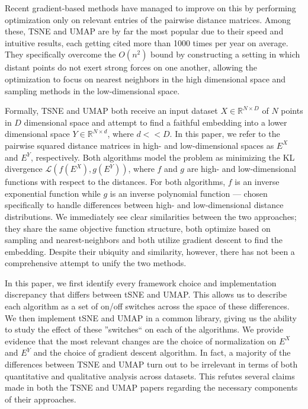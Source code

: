 \documentclass[sigconf, nonacm]{acmart}
\begin{document}
Recent gradient-based methods have managed to improve on this by performing optimization only on relevant entries of the pairwise distance matrices.
Among these, TSNE and UMAP are by far the most popular due to their speed and intuitive results, each getting cited more than 1000 times per year on average.
They specifically overcome the $O(n^2)$ bound by constructing a setting in which distant points do not exert strong forces on one another, allowing the optimization to focus on nearest neighbors in the high dimensional space and sampling methods in the low-dimensional space.

Formally, TSNE \cite{van2008visualizing} and UMAP \cite{mcinnes2018umap} both receive an input dataset $X \in \mathbb{R}^{N \times D}$ of
$N$ points in $D$ dimensional space and
attempt to find a faithful embedding into a lower dimensional space $Y \in \mathbb{R}^{N \times d}$, where $d << D$. 
 In this paper, we refer to the pairwise squared distance matrices in high- and low-dimensional spaces as $E^X$ and $E^Y$, respectively.
Both algorithms model the problem as minimizing the KL divergence $\mathcal{L}(f(E^X), g(E^Y))$, where $f$ and $g$ are high- and
low-dimensional functions with respect to the distances. For both algorithms, $f$ is an inverse exponential function while $g$ is an inverse polynomial function --- chosen specifically to handle differences between high- and low-dimensional distance distributions.
We immediately see clear similarities between the two approaches; they share the same objective function structure, both optimize based
on sampling and nearest-neighbors and both utilize gradient descent to find the embedding. Despite their ubiquity and similarity, however, there has not been
a comprehensive attempt to unify the two methods.

In this paper, we first identify every framework choice and implementation discrepancy that differs between tSNE and UMAP. This allows us to describe each algorithm as a set of on/off
switches across the space of these differences. We then implement tSNE and UMAP in a common library, giving us the ability to study the effect of these
''switches`` on each of the algorithms.
We provide evidence that the most relevant changes are the choice of normalization on $E^X$ and $E^Y$ and the choice of gradient descent algorithm.
In fact, a majority of the differences between TSNE and UMAP turn out to be irrelevant in terms of both quantitative and qualitative analysis across datasets.
This refutes several claims made in both the TSNE and UMAP papers regarding the necessary components of their approaches.
\end{document}
